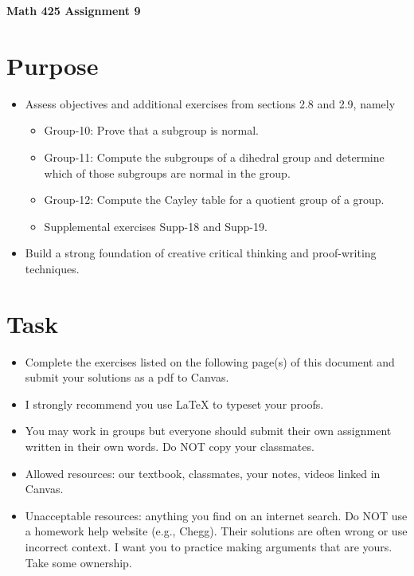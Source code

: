 \documentclass[12pt]{article}
\begin{document}
	\begin{center}
		{\Large \bf Math 425 Assignment 9}
	\end{center}
	\section*{Purpose}
	\begin{itemize}
		\item Assess objectives and additional exercises from sections 2.8 and 2.9, namely
		\begin{itemize}
			\item Group-10:	Prove that a subgroup is normal.
			\item Group-11:	Compute the subgroups of a dihedral group and determine which of those subgroups are normal in the group.
			\item Group-12:	Compute the Cayley table for a quotient group of a group.
			\item Supplemental exercises Supp-18 and Supp-19.
		\end{itemize}
		\item Build a strong foundation of creative critical thinking and proof-writing techniques.
	\end{itemize}
	\section*{Task}
	\begin{itemize}
		\item Complete the exercises listed on the following page(s) of this document and submit your solutions as a pdf to Canvas.
		\item I strongly recommend you use LaTeX to typeset your proofs.
		\item You may work in groups but everyone should submit their own assignment written in their own words.  Do NOT copy your classmates.
		\item Allowed resources: our textbook, classmates, your notes, videos linked in Canvas.
		\item Unacceptable resources: anything you find on an internet search. Do NOT use a homework help website (e.g., Chegg). Their solutions are often wrong or use incorrect context.  I want you to practice making arguments that are yours. Take some ownership.
	\end{itemize}
\end{document}
